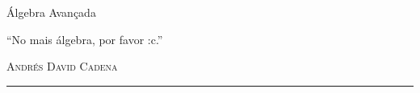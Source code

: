 \begin{titlepage}
\vspace*{2cm}

\noindent
\vspace*{0.5cm}
  \titlefont \hspace{-2cm}Álgebra Avançada \vspace{-0.32cm}\par
\vspace{1cm}
\epigraph{``No mais álgebra, por favor :c.''}
{ \textsc{Andrés David Cadena}}
\null\vfill
\vspace*{1cm}
\noindent
\hfill
\begin{minipage}{0.45\linewidth}
    \begin{flushright}
        \printauthor
    \end{flushright}
\end{minipage}
%
\begin{minipage}{0.02\linewidth}
    \rule{1pt}{120pt}
\end{minipage}
\titlepagedecoration
\end{titlepage}
